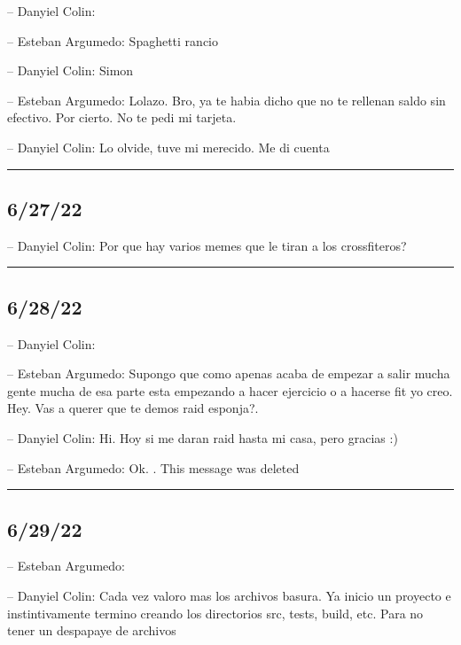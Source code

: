 -- Danyiel Colin:

-- Esteban Argumedo: Spaghetti rancio

-- Danyiel Colin: Simon

-- Esteban Argumedo: Lolazo. Bro, ya te habia dicho que no te rellenan
saldo sin efectivo. Por cierto. No te pedi mi tarjeta.

-- Danyiel Colin: Lo olvide, tuve mi merecido. Me di cuenta

\begin{center}\rule{0.5\linewidth}{0.5pt}\end{center}

\hypertarget{section-110}{%
\subsection{6/27/22}\label{section-110}}

-- Danyiel Colin: Por que hay varios memes que le tiran a los
crossfiteros?

\begin{center}\rule{0.5\linewidth}{0.5pt}\end{center}

\hypertarget{section-111}{%
\subsection{6/28/22}\label{section-111}}

-- Danyiel Colin:

-- Esteban Argumedo: Supongo que como apenas acaba de empezar a salir
mucha gente mucha de esa parte esta empezando a hacer ejercicio o a
hacerse fit yo creo. Hey. Vas a querer que te demos raid esponja?.

-- Danyiel Colin: Hi. Hoy si me daran raid hasta mi casa, pero gracias
:)

-- Esteban Argumedo: Ok. . This message was deleted

\begin{center}\rule{0.5\linewidth}{0.5pt}\end{center}

\hypertarget{section-112}{%
\subsection{6/29/22}\label{section-112}}

-- Esteban Argumedo:

-- Danyiel Colin: Cada vez valoro mas los archivos basura. Ya inicio un
proyecto e instintivamente termino creando los directorios src, tests,
build, etc. Para no tener un despapaye de archivos

